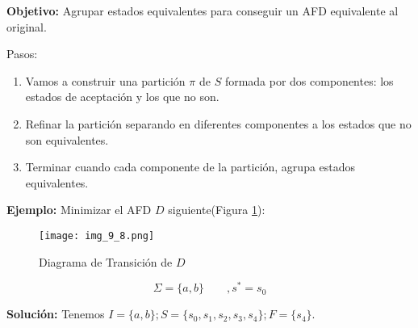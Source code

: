 \textbf{Objetivo: } Agrupar estados equivalentes para conseguir un AFD equivalente al original.

Pasos:
\begin{enumerate}
\item Vamos a construir una partición $\pi$ de $S$ formada por dos componentes: los estados de aceptación y los que no son.
\item Refinar la partición separando en diferentes componentes a los estados que no son equivalentes.
\item Terminar cuando cada componente de la partición, agrupa estados equivalentes.
\end{enumerate}

\textbf{Ejemplo: }Minimizar el AFD $D$ siguiente(Figura \ref{img_9_8}):

\begin{figure}[h!]
\centering
\texttt{[image: img\_9\_8.png]}
\caption{Diagrama de Transición de $D$}\label{img_9_8}
\end{figure}

$$\Sigma=\{a,b\} \qquad, s^*=s_0$$

\textbf{Solución: }Tenemos $I=\{a,b\}; S=\{s_0,s_1,s_2,s_3,s_4\}; F=\{s_4\}$.

